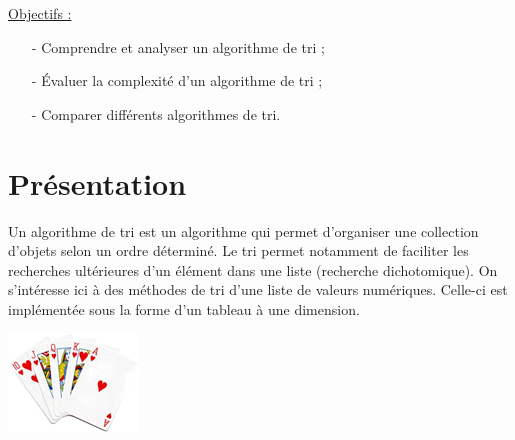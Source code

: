 \documentclass[t,11pt]{article}
\begin{document}
\entetecoursinfo


\begin{framed}
\underline{Objectifs :}
\begin{itemize}
\item[-] Comprendre et analyser un algorithme de tri ;
\item[-] Évaluer la complexité d'un algorithme de tri ;
\item[-] Comparer différents algorithmes de tri.
\end{itemize}
\end{framed}



\section{Présentation}

\begin{minipage}{.65\textwidth}%
Un algorithme de tri est un algorithme qui permet d'organiser une collection d'objets selon un ordre déterminé. Le tri permet notamment de faciliter les recherches ultérieures d'un élément dans une liste (recherche dichotomique).
On s'intéresse ici à des méthodes de tri d'une liste de valeurs numériques. Celle-ci est implémentée sous la forme d'un tableau à une dimension.

\end{minipage}%
\hfill
\begin{minipage}{.3\textwidth}%
\includegraphics[width=\textwidth]{images/cartes.png}
\end{minipage}
\end{document}
